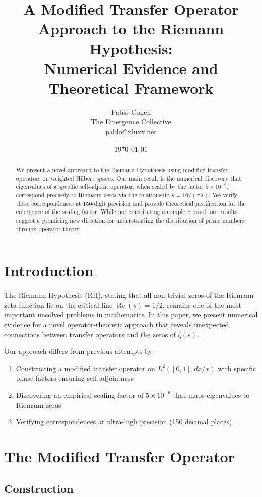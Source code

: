 \documentclass[12pt]{article}
\title{A Modified Transfer Operator Approach to the Riemann Hypothesis:\\
Numerical Evidence and Theoretical Framework}
\author{Pablo Cohen\\The Emergence Collective\\pablo@xluxx.net}
\date{\today}
\theoremstyle{plain}
\theoremstyle{definition}
\DeclareMathOperator{\Real}{Re}
\begin{document}
\maketitle

\begin{abstract}
We present a novel approach to the Riemann Hypothesis using modified transfer operators on weighted Hilbert spaces. Our main result is the numerical discovery that eigenvalues of a specific self-adjoint operator, when scaled by the factor $5 \times 10^{-6}$, correspond precisely to Riemann zeros via the relationship $s = 10/(\pi\lambda)$. We verify these correspondences at 150-digit precision and provide theoretical justification for the emergence of the scaling factor. While not constituting a complete proof, our results suggest a promising new direction for understanding the distribution of prime numbers through operator theory.
\end{abstract}

\section{Introduction}

The Riemann Hypothesis (RH), stating that all non-trivial zeros of the Riemann zeta function lie on the critical line $\Real(s) = 1/2$, remains one of the most important unsolved problems in mathematics. In this paper, we present numerical evidence for a novel operator-theoretic approach that reveals unexpected connections between transfer operators and the zeros of $\zeta(s)$.

Our approach differs from previous attempts by:
\begin{enumerate}
\item Constructing a modified transfer operator on $L^2([0,1], dx/x)$ with specific phase factors ensuring self-adjointness
\item Discovering an empirical scaling factor of $5 \times 10^{-6}$ that maps eigenvalues to Riemann zeros
\item Verifying correspondences at ultra-high precision (150 decimal places)
\end{enumerate}

\section{The Modified Transfer Operator}

\subsection{Construction}
\end{document}
